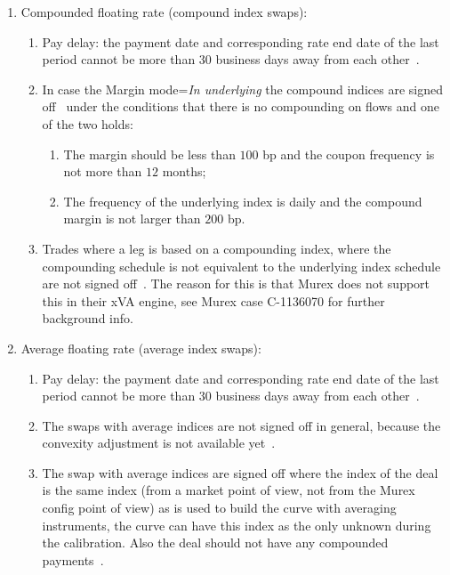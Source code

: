 \documentclass[]{pmv_report} %
\begin{document}
\begin{enumerate}
\begin{enumerate}
        \end{enumerate}
  \item Compounded floating rate (compound index swaps):
      \begin{enumerate}
          \item Pay delay: the payment date and corresponding rate end date of the last period cannot be more than 30 business days away from each other~\cite{MxSettings.IRS}.
          \item In case the Margin mode=\textit{In underlying} the compound indices are signed off~\cite{MxSettings.IRS,MxSettings.IRSGenerator} under the conditions that there is no compounding on flows and one of the two holds:
            \begin{enumerate}
              \item The margin should be less than $100$ bp and the coupon frequency is not more than $12$ months;
              \item The frequency of the underlying index is daily and the compound margin is not larger than $200$ bp.
            \end{enumerate}
          \item Trades where a leg is based on a compounding index, where the compounding schedule is not equivalent to the underlying index schedule are not signed off~\cite{MxSettings.IRS,MxSettings.IRSGenerator}.
	   The reason for this is that Murex does not support this in their xVA engine, see Murex case C-1136070 for further background info.
      \end{enumerate}
  \item Average floating rate (average index swaps):
      \begin{enumerate}
          \item Pay delay: the payment date and corresponding rate end date of the last period cannot be more than 30 business days away from each other~\cite{MxSettings.IRS}.
          \item The swaps with average indices are not signed off in general, because the convexity adjustment is not available yet~\cite{MxSettings.IRS,MxSettings.IRSGenerator}.
          \item The swap with average indices are signed off where the index of the deal is the same index (from a market point of view, not from the Murex config point of view) as is used to build the curve with averaging instruments, the curve can have this index as the only unknown during the calibration.
              Also the deal should not have any compounded payments~\cite{MxSettings.IRS,MxSettings.IRSGenerator}.

\end{enumerate}
\end{enumerate}
\end{document}
